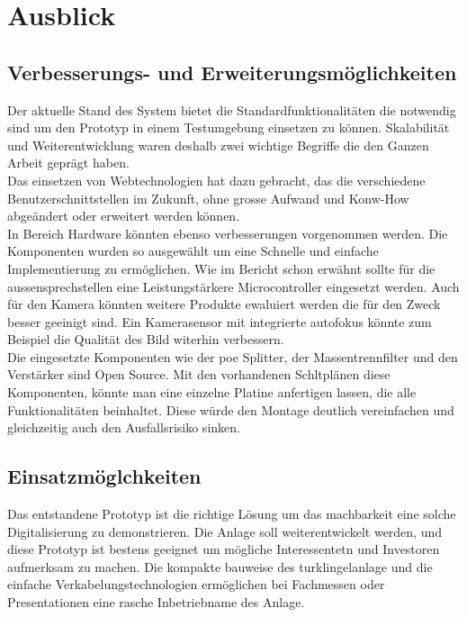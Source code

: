 \section{Ausblick}
\label{sec:ausblick}
\subsection{Verbesserungs- und Erweiterungsmöglichkeiten}
\label{sec:erweiterungen}
Der aktuelle Stand des System  bietet die Standardfunktionalitäten die notwendig sind um den Prototyp in einem Testumgebung einsetzen zu können. Skalabilität und Weiterentwicklung waren deshalb zwei wichtige Begriffe die den Ganzen Arbeit geprägt haben.\\
Das einsetzen von Webtechnologien hat dazu gebracht, das die verschiedene Benutzerschnittstellen im Zukunft, ohne grosse Aufwand und Konw-How abgeändert oder erweitert werden können. 
\\
In Bereich Hardware könnten ebenso verbesserungen vorgenommen werden. Die Komponenten wurden so ausgewählt um eine Schnelle und einfache Implementierung zu ermöglichen. Wie im Bericht schon erwähnt sollte für die \gls{aussensprechstelle}n eine Leistungstärkere Microcontroller eingesetzt werden. Auch für den Kamera könnten weitere Produkte ewaluiert werden die für den Zweck besser geeinigt sind. Ein Kamerasensor mit integrierte autofokus könnte zum Beispiel die Qualität des Bild witerhin verbessern.\\
Die eingesetzte Komponenten wie der \gls{poe} Splitter, der Massentrennfilter und den Verstärker sind Open Source. Mit den vorhandenen Schltplänen diese Komponenten, könnte man eine einzelne Platine anfertigen lassen, die alle Funktionalitäten beinhaltet. Diese würde den Montage deutlich  vereinfachen und gleichzeitig auch den Ausfallsrisiko sinken. 

\subsection{Einsatzmöglchkeiten}
\label{sec:eisatz}
Das entstandene Prototyp ist die richtige Lösung um das machbarkeit eine solche Digitalisierung zu demonstrieren. Die Anlage soll weiterentwickelt werden, und diese Prototyp ist bestens geeignet um mögliche Interessentetn und Investoren aufmerksam zu machen. Die kompakte bauweise des \gls{turklingelanlage} und die einfache Verkabelungstechnologien ermöglichen bei Fachmessen oder Presentationen eine rasche Inbetriebname des Anlage. 

\newpage

